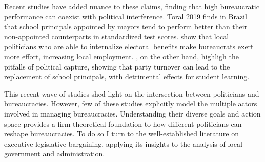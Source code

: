 \documentclass[12pt,a4paper]{article}
\begin{document}
Recent studies have added nuance to these claims, finding that high bureaucratic performance can coexist with political interference. Toral 2019 finds in Brazil that school principals appointed by mayors tend to perform better than their non-appointed counterparts in standardized test scores. \citet{gulzar_politicians_2017} show that local politicians who are able to internalize electoral benefits make bureaucrats exert more effort, increasing local employment. \citet{akhtari_political_2015}, on the other hand, highligh the pitfalls of political capture, showing that party turnover can lead to the replacement of school principals, with detrimental effects for student learning.

This recent wave of studies shed light on the intersection between politicians and bureaucracies. However, few of these studies explicitly model the multiple actors involved in managing bureaucracies. Understanding their diverse goals and action space provides a firm theoretical foundation to how different politicians can reshape bureaucracies. To do so I turn to the well-established literature on executive-legislative bargaining, applying its insights to the analysis of local government and administration.



\end{document}

